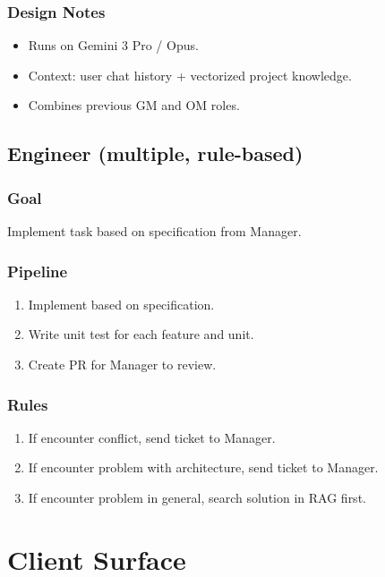 \documentclass[11pt,a4paper]{article}
\begin{document}
\subsubsection{Design Notes}
\begin{itemize}
  \item Runs on Gemini 3 Pro / Opus.
  \item Context: user chat history + vectorized project knowledge.
  \item Combines previous GM and OM roles.
\end{itemize}

\subsection{Engineer (multiple, rule-based)}

\subsubsection{Goal}
Implement task based on specification from Manager.

\subsubsection{Pipeline}
\begin{enumerate}
  \item Implement based on specification.
  \item Write unit test for each feature and unit.
  \item Create PR for Manager to review.
\end{enumerate}

\subsubsection{Rules}
\begin{enumerate}
  \item If encounter conflict, send ticket to Manager.
  \item If encounter problem with architecture, send ticket to Manager.
  \item If encounter problem in general, search solution in RAG first.
\end{enumerate}

\section{Client Surface}
\end{document}
